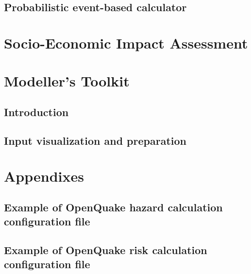 \documentclass[12pt,a4paper,smallheadings]{scrbook}
\begin{document}
\chapter{Probabilistic event-based calculator}
	
\part{Socio-Economic Impact Assessment}
	
\part{Modeller's Toolkit}
\chapter{Introduction}
	
\chapter{Input visualization and preparation}
	
\part{Appendixes}
\appendix
\chapter{Example of OpenQuake hazard calculation configuration file}
	
\chapter{Example of OpenQuake risk calculation configuration file}


\end{document}
